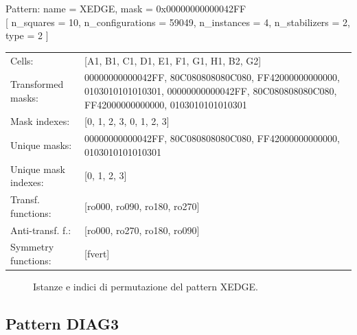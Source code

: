 \begin{tcolorbox}[sharp corners, fontupper=\ttfamily\small, colback=white]
  \noindent Pattern: name = XEDGE, mask = 0x00000000000042FF\\
  {[} n\_squares = 10, n\_configurations = 59049,
  n\_instances = 4, n\_stabilizers = 2, type = 2 { ]}\\[1.0ex]
  \begin{tabularx}{\textwidth}{@{} p{3.5cm} X @{}}
    Cells:               & {[}A1, B1, C1, D1, E1, F1, G1, H1, B2, G2{]}\\[0.5ex]
    Transformed masks:   & 00000000000042FF, 80C080808080C080, FF42000000000000, 0103010101010301, 00000000000042FF, 80C080808080C080, FF42000000000000, 0103010101010301\\[0.5ex]
    Mask indexes:        & {[}0, 1, 2, 3, 0, 1, 2, 3{]}\\[0.5ex]
    Unique masks:        & 00000000000042FF, 80C080808080C080, FF42000000000000, 0103010101010301\\[0.5ex]
    Unique mask indexes: & {[}0, 1, 2, 3{]}\\[0.5ex]
    Transf. functions:   & {[}ro000, ro090, ro180, ro270{]}\\[0.5ex]
    Anti-transf. f.:     & {[}ro000, ro270, ro180, ro090{]}\\[0.5ex]
    Symmetry functions:  & {[}fvert{]}\\[0.5ex]
  \end{tabularx}
\end{tcolorbox}

\begin{figure}[htbp]
  \centering
   \hfill
   \hfill
   \hfill
  \vspace{0.3cm}
   \hfill
   \hfill
   \hfill
  \caption{Istanze e indici di permutazione del pattern XEDGE.}
\end{figure}

\newpage

\subsection{Pattern DIAG3}

